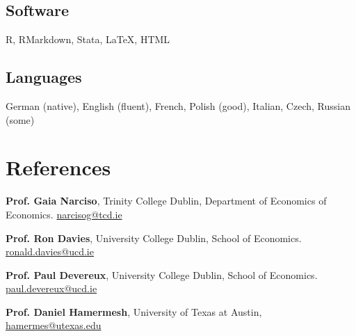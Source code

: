 \documentclass[10pt,a4paper,]{article}
\begin{document}
\hypertarget{software}{%
\subsection{Software}\label{software}}

R, RMarkdown, Stata, LaTeX, HTML

\hypertarget{languages}{%
\subsection{Languages}\label{languages}}

German (native), English (fluent), French, Polish (good), Italian,
Czech, Russian (some)

\hypertarget{references}{%
\section{References}\label{references}}

\textbf{Prof. Gaia Narciso}, Trinity College Dublin, Department of
Economics of Economics. \href{mailto:narcisog@tcd.ie}{narcisog@tcd.ie}

\textbf{Prof. Ron Davies}, University College Dublin, School of
Economics. \href{mailto:ronald.davies@ucd.ie}{ronald.davies@ucd.ie}

\textbf{Prof. Paul Devereux}, University College Dublin, School of
Economics. \href{mailto:paul.devereux@ucd.ie}{paul.devereux@ucd.ie}

\textbf{Prof. Daniel Hamermesh}, University of Texas at Austin,
\href{mailto:hamermes@utexas.edu}{hamermes@utexas.edu}
\end{document}
